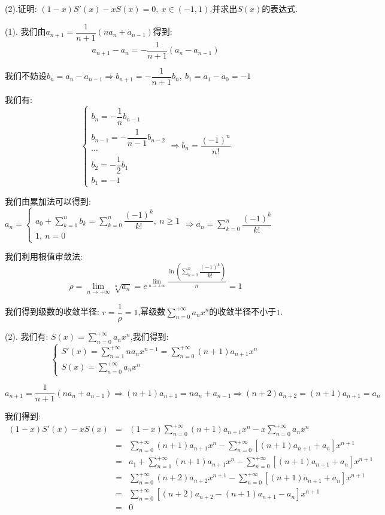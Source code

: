(2).证明:  $(1-x)S'(x)-xS(x)=0,\ x\in(-1,1)$,并求出$S(x)$的表达式.
\begin{solution}

	(1). 我们由$a_{n+1}=\dfrac{1}{n+1}(na_{n}+a_{n-1})$得到:  
	$$a_{n+1}-a_{n}=-\dfrac{1}{n+1}(a_{n}-a_{n-1})$$
	
	我们不妨设$b_{n}=a_{n}-a_{n-1}\Rightarrow b_{n+1}=-\dfrac{1}{n+1}b_{n},\ b_{1}=a_{1}-a_{0}=-1$
	
	我们有:  $$\left\lbrace
	\begin{array}{l}
		b_{n}=-\dfrac{1}{n}b_{n-1}\\
		b_{n-1}=-\dfrac{1}{n-1}b_{n-2}\\
		\cdots\\
		b_{2}=-\dfrac{1}{2}b_{1}\\
		b_{1}=-1
	\end{array}
	\right. \Rightarrow b_{n}=\dfrac{(-1)^{n}}{n!}$$
	
	我们由累加法可以得到:  $a_{n}=\left\lbrace
	\begin{array}{l}
		a_{0}+\sum\limits_{k=1}^{n}b_{k}=\sum\limits_{k=0}^{n}\dfrac{(-1)^k}{k!},\ n\geq 1\\
		1,\ n=0
	\end{array}
	\right. \Rightarrow a_{n}=\sum\limits_{k=0}^{n}\dfrac{(-1)^k}{k!}$
	
	我们利用根值审敛法:  
	$$\rho=\lim\limits_{n\rightarrow+\infty}\sqrt[n]{a_{n}}=e^{\lim\limits_{n\rightarrow +\infty}\dfrac{\ln(\sum\limits_{k=0}^{n}\dfrac{(-1)^k}{k!})}{n}}=1$$
		
	我们得到级数的收敛半径:  $r=\dfrac{1}{\rho}=1$,幂级数$\sum\limits_{n=0}^{+\infty}a_{n}x^n$的收敛半径不小于$1$.

	(2). 我们有:  $S(x)=\sum\limits_{n=0}^{+\infty}a_{n}x^{n}$,我们得到:  
	$$\left\lbrace
	\begin{array}{l}
		S'(x)=\sum\limits_{n=1}^{+\infty}na_{n}x^{n-1}=\sum\limits_{n=0}^{+\infty}(n+1)a_{n+1}x^{n}\\
		S(x)=\sum\limits_{n=0}^{+\infty}a_{n}x^{n}
	\end{array}
	\right.$$
	
	$$a_{n+1}=\dfrac{1}{n+1}(na_{n}+a_{n-1})\Rightarrow (n+1)a_{n+1}=na_{n}+a_{n-1}\Rightarrow (n+2)a_{n+2}=(n+1)a_{n+1}=a_{n}$$
	
	我们得到:  
	\begin{eqnarray*}
		(1-x)S'(x)-xS(x)&=&(1-x)\sum\limits_{n=0}^{+\infty}(n+1)a_{n+1}x^{n}-x\sum\limits_{n=0}^{+\infty}a_{n}x^{n}\\
		&=&\sum\limits_{n=0}^{+\infty}(n+1)a_{n+1}x^{n}-\sum\limits_{n=0}^{+\infty}[(n+1)a_{n+1}+a_{n}]x^{n+1}\\
		&=&a_{1}+\sum\limits_{n=1}^{+\infty}(n+1)a_{n+1}x^{n}-\sum\limits_{n=0}^{+\infty}[(n+1)a_{n+1}+a_{n}]x^{n+1}\\
		&=&\sum\limits_{n=0}^{+\infty}(n+2)a_{n+2}x^{n+1}-\sum\limits_{n=0}^{+\infty}[(n+1)a_{n+1}+a_{n}]x^{n+1}\\
		&=&\sum\limits_{n=0}^{+\infty}[(n+2)a_{n+2}-(n+1)a_{n+1}-a_{n}]x^{n+1}\\
		&=&0
	\end{eqnarray*}
	

\end{solution}
